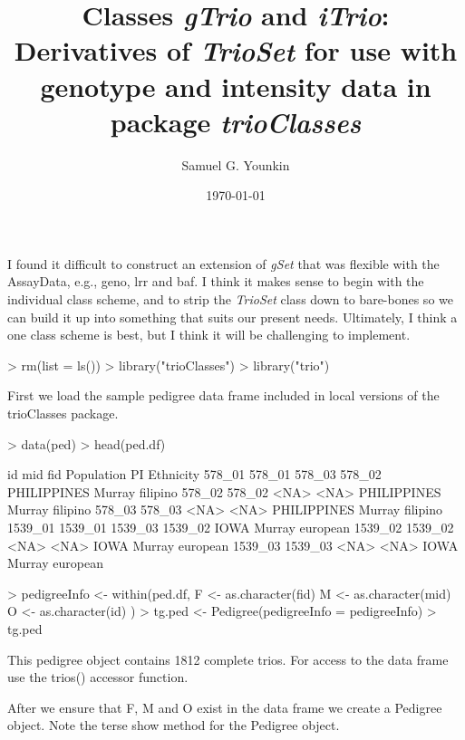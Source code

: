 \documentclass[10pt]{article}
\title{Classes \emph{gTrio} and \emph{iTrio}: Derivatives of \emph{TrioSet} for use with genotype and intensity data in package \emph{trioClasses}}
\author{Samuel G. Younkin}
\date{\today}
\begin{document}
\setlength{\parskip}{0.2\baselineskip}
\setlength{\parindent}{0pt}
\maketitle
I found it difficult to construct an extension of \emph{gSet} that was flexible with the AssayData, e.g., geno, lrr and baf.  I think it makes sense to begin with the individual class scheme, and to strip the \emph{TrioSet} class down to bare-bones so we can build it up into something that suits our present needs.  Ultimately, I think a one class scheme is best, but I think it will be challenging to implement.
\begin{Schunk}
\begin{Sinput}
> rm(list = ls())
> library("trioClasses")
> library("trio")
\end{Sinput}
\end{Schunk}
First we load the sample pedigree data frame included in local versions of the trioClasses package.
\begin{Schunk}
\begin{Sinput}
> data(ped)
> head(ped.df)
\end{Sinput}
\begin{Soutput}
             id     mid     fid  Population     PI Ethnicity
578_01   578_01  578_03  578_02 PHILIPPINES Murray  filipino
578_02   578_02    <NA>    <NA> PHILIPPINES Murray  filipino
578_03   578_03    <NA>    <NA> PHILIPPINES Murray  filipino
1539_01 1539_01 1539_03 1539_02        IOWA Murray  european
1539_02 1539_02    <NA>    <NA>        IOWA Murray  european
1539_03 1539_03    <NA>    <NA>        IOWA Murray  european
\end{Soutput}
\begin{Sinput}
> pedigreeInfo <- within(ped.df, {
     F <- as.character(fid)
     M <- as.character(mid)
     O <- as.character(id)
 })
> tg.ped <- Pedigree(pedigreeInfo = pedigreeInfo)
> tg.ped
\end{Sinput}
\begin{Soutput}
This pedigree object contains 1812 complete trios.
For access to the data frame use the trios() accessor function.
\end{Soutput}
\end{Schunk}
After we ensure that F, M and O exist in the data frame we create a Pedigree object.  Note the terse show method for the Pedigree object.
\end{document}
